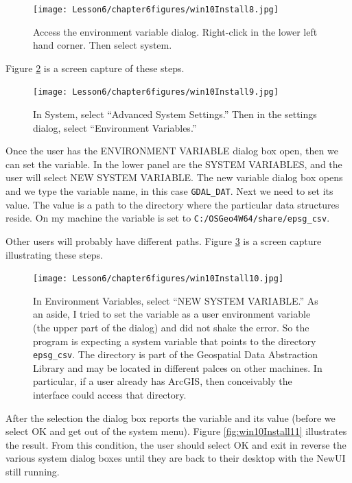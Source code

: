 \begin{figure}[h!] %
   \centering
   \texttt{[image: Lesson6/chapter6figures/win10Install8.jpg]} 
   \caption{Access the environment variable dialog.   Right-click in the lower left hand corner.  Then select system.}
   \label{fig:win10Install8}
\end{figure}

\newpage Figure \ref{fig:win10Install9} is a screen capture of these steps.   
\begin{figure}[h!] %
   \centering
   \texttt{[image: Lesson6/chapter6figures/win10Install9.jpg]} 
   \caption{In System, select ``Advanced System Settings.''   Then in the settings dialog, select ``Environment Variables.''}
   \label{fig:win10Install9}
\end{figure}

\clearpage
Once the user has the ENVIRONMENT VARIABLE dialog box open, then we can set the variable.
In the lower panel are the SYSTEM VARIABLES, and the user will select NEW SYSTEM VARIABLE.
The new variable dialog box opens and we type the variable name, in this case \texttt{GDAL\_DAT}.
Next we need to set its value.
The value is a path to the directory where the particular data structures reside.  
On my machine the variable is set to \texttt{C:/OSGeo4W64/share/epsg\_csv}.

Other users will probably have different paths. 
Figure \ref{fig:win10Install10} is a screen capture illustrating these steps.

\begin{figure}[h!] %
   \centering
   \texttt{[image: Lesson6/chapter6figures/win10Install10.jpg]} 
   \caption{In Environment Variables, select ``NEW SYSTEM VARIABLE.''  As an aside, I tried to set the variable as a user environment variable (the upper part of the dialog) and did not shake the error.  So the program is expecting a system variable that points to the directory \texttt{epsg\_csv}.   The directory is part of the Geospatial Data Abstraction Library and may be located in different palces on other machines.  In particular, if a user already has ArcGIS, then conceivably the interface could access that directory.}
   \label{fig:win10Install10}
\end{figure}

After the selection the dialog box reports the variable and its value (before we select OK and get out of the system menu).
Figure \ref{fig:win10Install11} illustrates the result.  
From this condition, the user should select OK and exit in reverse the various system dialog boxes until they are back to their desktop with the NewUI still running.

